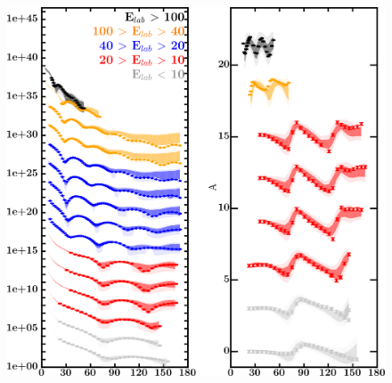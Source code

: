 \documentclass[twocolumn,secnumarabic,amssymb, nobibnotes, aps, prl,
superscriptaddress, nobalancelastpage, draft]{revtex4}
\begin{document}
\begin{figure}[!htb]
    \centering
    \begin{minipage}{0.4\linewidth}
        \centering
        \includegraphics[width=\linewidth]{figures/ca48_protonElastic.png}
        \label{DOM_ca48_proton_elastic}
    \end{minipage}\hspace{6pt}
    \begin{minipage}{0.4\linewidth}
        \centering

\end{minipage}
\end{figure}
\end{document}
